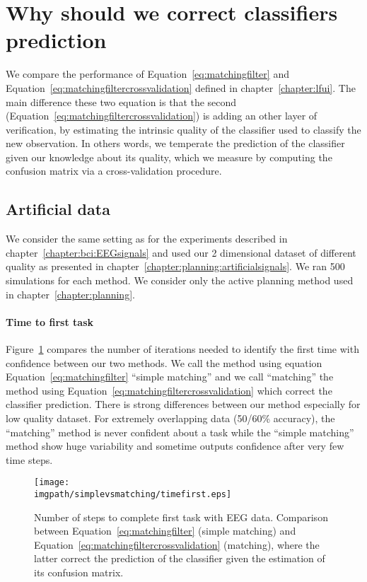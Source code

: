 
\section{Why should we correct classifiers prediction}
\label{chapter:limitiations:simplevsmatching}

We compare the performance of Equation~\ref{eq:matchingfilter} and Equation~\ref{eq:matchingfiltercrossvalidation} defined in chapter~\ref{chapter:lfui}. The main difference these two equation is that the second (Equation~\ref{eq:matchingfiltercrossvalidation}) is adding an other layer of verification, by estimating the intrinsic quality of the classifier used to classify the new observation. In others words, we temperate the prediction of the classifier given our knowledge about its quality, which we measure by computing the confusion matrix via a cross-validation procedure.

\subsection{Artificial data}

We consider the same setting as for the experiments described in chapter~\ref{chapter:bci:EEGsignals} and used our 2 dimensional dataset of different quality as presented in chapter~\ref{chapter:planning:artificialsignals}. We ran 500 simulations for each method. We consider only the active planning method used in chapter~\ref{chapter:planning}.

\paragraph{Time to first task} Figure~\ref{fig:timefirst_simplevsmatching} compares the number of iterations needed to identify the first time with confidence between our two methods. We call the method using equation Equation~\ref{eq:matchingfilter} ``simple matching'' and we call ``matching'' the method using Equation~\ref{eq:matchingfiltercrossvalidation} which correct the classifier prediction. There is strong differences between our method especially for low quality dataset. For extremely overlapping data (50/60\% accuracy), the ``matching'' method is never confident about a task while the ``simple matching'' method show huge variability and sometime outputs confidence after very few time steps. 

\begin{figure}[!ht]
\centering
\texttt{[image: \\imgpath/simplevsmatching/timefirst.eps]}
\caption{Number of steps to complete first task with EEG data. Comparison between Equation~\ref{eq:matchingfilter} (simple matching) and Equation~\ref{eq:matchingfiltercrossvalidation} (matching), where the latter correct the prediction of the classifier given the estimation of its confusion matrix.}
\label{fig:timefirst_simplevsmatching}
\end{figure} 

